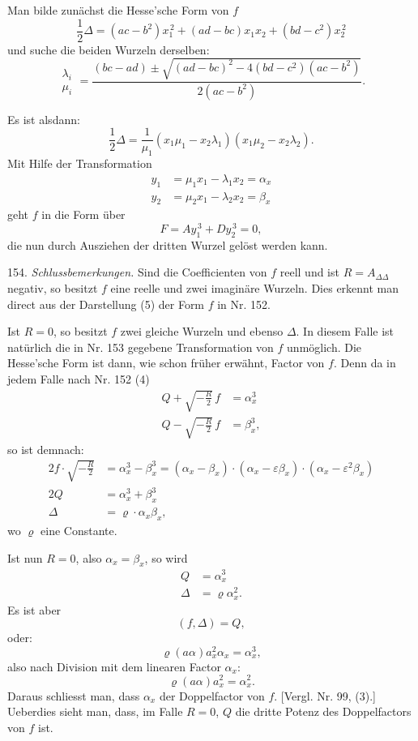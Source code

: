 Man bilde zunächst die Hesse'sche Form von $f$
\[
\frac{1}{2}\Delta=(ac-b^2)x_1^{\,2}+(ad-bc)x_1x_2+(bd-c^2)x_2^{\,2}
\]
und suche die beiden Wurzeln derselben:
\[
\begin{matrix}\lambda_i\\ \mu_i\end{matrix}
=\frac{(bc-ad)\pm\sqrt{(ad-bc)^2-4(bd-c^2)(ac-b^2)}}{2(ac-b^2)}.
\]

Es ist alsdann:
\[
\frac{1}{2}\Delta=\frac{1}{\mu_1}(x_1\mu_1-x_2\lambda_1)(x_1\mu_2-x_2\lambda_2).
\]
Mit Hilfe der Transformation
\[
\begin{aligned}
y_1&=\mu_1x_1-\lambda_1x_2=\alpha_x\\
y_2&=\mu_2x_1-\lambda_2x_2=\beta_x
\end{aligned}
\]
geht $f$ in die Form über
\[
F=Ay_1^{\,3}+Dy_2^{\,3}=0,
\]
die nun durch Ausziehen der dritten Wurzel gelöst werden kann.

154. \textit{Schlussbemerkungen.} Sind die Coefficienten von $f$ reell und ist $R=A_{\Delta\Delta}$ negativ, so besitzt $f$ eine reelle und zwei imaginäre Wurzeln. Dies erkennt man direct aus der Darstellung (5) der Form $f$ in Nr. 152.



Ist $R=0$, so besitzt $f$ zwei gleiche Wurzeln und ebenso $\Delta$. In diesem Falle ist natürlich die in Nr. 153 gegebene Transformation von $f$ unmöglich. %
Die Hesse'sche Form ist dann, wie schon früher erwähnt, Factor von $f$. Denn da in jedem Falle nach Nr. 152 (4)
\[
\begin{aligned}
Q+\sqrt{-\frac{R}{2}}\,f&=\alpha_x^3\\
Q-\sqrt{-\frac{R}{2}}\,f&=\beta_x^3,
\end{aligned}
\]
so ist demnach:
\[
\begin{aligned}
2f\cdot\sqrt{-\frac{R}{2}}&=\alpha_x^3-\beta_x^3=(\alpha_x-\beta_x)\cdot(\alpha_x-\varepsilon\beta_x)\cdot(\alpha_x-\varepsilon^2\beta_x)\\
2Q&=\alpha_x^3+\beta_x^3\\
\Delta&=\varrho\cdot\alpha_x\beta_x,
\end{aligned}
\]
wo $\varrho$ eine Constante.

Ist nun $R=0$, also $\alpha_x=\beta_x$, so wird
\[
\begin{aligned}
Q&=\alpha_x^3\\
\Delta&=\varrho\alpha_x^2.
\end{aligned}
\]
Es ist aber
\[
(f,\Delta)=Q,
\]
oder:
\[
\varrho(a\alpha)a_x^2\alpha_x=\alpha_x^3,
\]
also nach Division mit dem linearen Factor $\alpha_x$:
\[
\varrho(a\alpha)a_x^2=\alpha_x^2.
\]
Daraus schliesst man, dass $\alpha_x$ der Doppelfactor von $f$. [Vergl. Nr. 99, (3).] Ueberdies sieht man, dass, im Falle $R=0$, $Q$ die dritte Potenz des Doppelfactors von $f$ ist.

